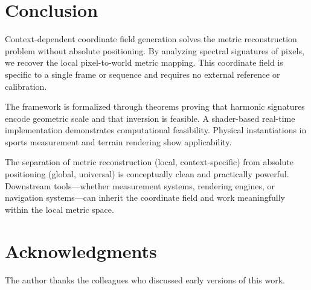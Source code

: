 \documentclass[11pt,twocolumn,a4paper]{article}
\theoremstyle{definition}
\begin{document}
\section{Conclusion}

Context-dependent coordinate field generation solves the metric reconstruction problem without absolute positioning. By analyzing spectral signatures of pixels, we recover the local pixel-to-world metric mapping. This coordinate field is specific to a single frame or sequence and requires no external reference or calibration.

The framework is formalized through theorems proving that harmonic signatures encode geometric scale and that inversion is feasible. A shader-based real-time implementation demonstrates computational feasibility. Physical instantiations in sports measurement and terrain rendering show applicability.

The separation of metric reconstruction (local, context-specific) from absolute positioning (global, universal) is conceptually clean and practically powerful. Downstream tools—whether measurement systems, rendering engines, or navigation systems—can inherit the coordinate field and work meaningfully within the local metric space.

\section*{Acknowledgments}

The author thanks the colleagues who discussed early versions of this work.



\end{document}
